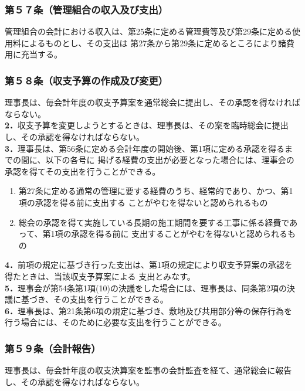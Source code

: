 \documentclass[12pt,uplatex,dvipdfmx]{jsarticle}
\begin{document}
\subsubsection*{第５７条（管理組合の収入及び支出）}
管理組合の会計における収入は、第25条に定める管理費等及び第29条に定める使用料によるものとし、その支出は
第27条から第29条に定めるところにより諸費用に充当する。
\subsubsection*{第５８条（収支予算の作成及び変更）}
理事長は、毎会計年度の収支予算案を通常総会に提出し、その承認を得なければならない。\\
\textbf{2．}収支予算を変更しようとするときは、理事長は、その案を臨時総会に提出し、その承認を得なければならない。\\
\textbf{3．}理事長は、第56条に定める会計年度の開始後、第1項に定める承認を得るまでの間に、以下の各号に
掲げる経費の支出が必要となった場合には、理事会の承認を得てその支出を行うことができる。
\begin{enumerate}
\item 第27条に定める通常の管理に要する経費のうち、経常的であり、かつ、第1項の承認を得る前に支出する
      ことがやむを得ないと認められるもの
\item 総会の承認を得て実施している長期の施工期間を要する工事に係る経費であって、第1項の承認を得る前に
      支出することがやむを得ないと認められるもの
\end{enumerate}
\textbf{4．}前項の規定に基づき行った支出は、第1項の規定により収支予算案の承認を得たときは、当該収支予算案による
支出とみなす。\\
\textbf{5．}理事会が第54条第1項(10)の決議をした場合には、理事長は、同条第2項の決議に基づき、その支出を行うことができる。\\
\textbf{6．}理事長は、第21条第6項の規定に基づき、敷地及び共用部分等の保存行為を行う場合には、そのために必要な支出を行うことができる。
\subsubsection*{第５９条（会計報告）}
理事長は、毎会計年度の収支決算案を監事の会計監査を経て、通常総会に報告し、その承認を得なければならない。
\end{document}

